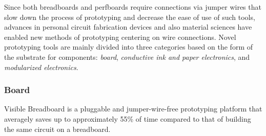 
Since both breadboards and perfboards require connections via jumper wires that slow down the process of prototyping and decrease the ease of use of such tools, advances in personal circuit fabrication devices and also material sciences have enabled new methods of prototyping centering on wire connections.
Novel prototyping tools are mainly divided into three categories based on the form of the substrate for components: \textit{board}, \textit{conductive ink and paper electronics}, and \textit{modularized electronics}.

\subsubsection{Board}
Visible Breadboard \cite{Visible_Breadboard} is a pluggable and jumper-wire-free prototyping platform that averagely saves up to approximately 55\% of time compared to that of building the same circuit on a breadboard.

